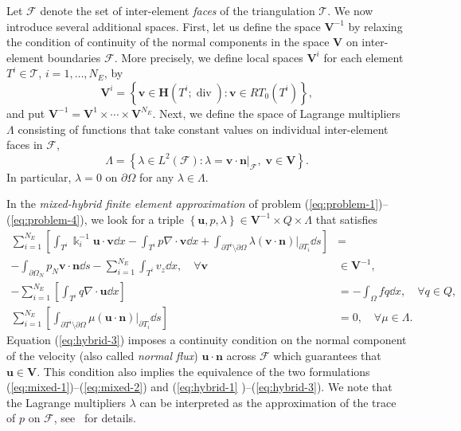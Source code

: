 Let $\mathcal{F}$ denote the set of inter-element \emph{faces} of the
triangulation $\mathcal{T}$. We now introduce several additional spaces.
First, let us define the space $\mathbf{V}^{-1}$ by relaxing the condition of
continuity of the normal components in the space $\mathbf{V}$ on inter-element
boundaries $\mathcal{F}$. More precisely, we define local spaces
$\mathbf{V}^{i}$ for each element $T^{i}\in\mathcal{T}$, $i=1,\ldots,N_{E}$,
by
\begin{equation}
\mathbf{V}^{i}=\left\{  \mathbf{v}\in\mathbf{H}(T^{i};\operatorname{div}%
):\mathbf{v}\in RT_{0}(T^{i})\right\}  ,
\end{equation}
and put $\mathbf{V}^{-1}=\mathbf{V}^{1}\times\cdots\times\mathbf{V}^{N_{E}}$.
Next, we define the space of Lagrange multipliers $\Lambda$ consisting of
functions that take constant values on individual inter-element faces in
$\mathcal{F}$,
\begin{equation}
\Lambda=\left\{  \lambda\in L^{2}\left(  \mathcal{F}\right)  :\lambda
=\mathbf{v}\cdot\mathbf{n}|_{\mathcal{F}},\;\mathbf{v\in V} \right\}.
\label{eq:lambda_space}
\end{equation}
In particular, $\lambda=0$ on $\partial\Omega$ for any $\lambda\in\Lambda$.


In the \emph{mixed-hybrid finite element approximation} of problem
(\ref{eq:problem-1})--(\ref{eq:problem-4}), we look for a triple $\left\{
\mathbf{u},p,\lambda\right\}  \in\mathbf{V}^{-1}\times Q\times\Lambda$ that
satisfies
\begin{align}
\sum_{i=1}^{N_{E}}\left[  \int_{T^{i}}\Bbbk_{i}^{-1}\mathbf{u}\cdot
\mathbf{v}\dd x-\int_{T^{i}}p\nabla\cdot\mathbf{v}\dd x+\int_{\partial
T^{i}\setminus\partial\Omega}\lambda(\mathbf{v}\cdot\mathbf{n})|_{\partial
T_{i}}\dd s\right]   &  =\label{eq:hybrid-1}\\
-\int_{\partial\Omega_{N}}p_{N}\mathbf{v}\cdot\mathbf{n}\dd s-\sum_{i=1}%
^{N_{E}}\int_{T^{i}}v_{z}\dd x,\quad\forall\mathbf{v}  &  \in\mathbf{V}^{-1}%
,\nonumber\\
-\sum_{i=1}^{N_{E}}\left[  \int_{T^{i}}q\nabla\cdot\mathbf{u}\dd x\right]   &
=-\int_{\Omega}fq\dd x,\quad\forall q\in Q,\label{eq:hybrid-2}\\
\sum_{i=1}^{N_{E}}\left[  \int_{\partial T^{i}\setminus\partial\Omega}%
\mu(\mathbf{u}\cdot\mathbf{n})|_{\partial T_{i}}\dd s\right]   &
=0,\quad\forall\mu\in\Lambda. \label{eq:hybrid-3}%
\end{align}
Equation (\ref{eq:hybrid-3}) imposes a continuity condition on the normal
component of the velocity (also called \emph{normal flux}) $\mathbf{u}\cdot\mathbf{n}$ across $\mathcal{F}$ which guarantees that
$\mathbf{u}\in\mathbf{V}$. This condition also implies the equivalence of the
two formulations (\ref{eq:mixed-1})--(\ref{eq:mixed-2}) and (\ref{eq:hybrid-1}%
)--(\ref{eq:hybrid-3}). We note that the Lagrange multipliers $\lambda$ can be
interpreted as the approximation of the trace of $p$ on $\mathcal{F}$,
see~\cite{Cowsar-1995-BDD} for details.

